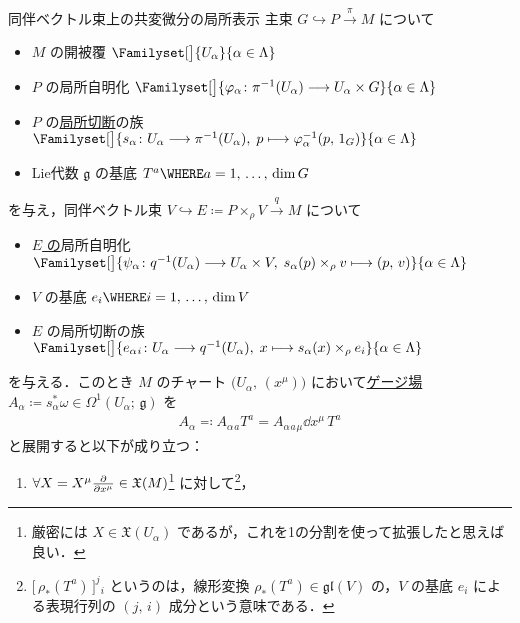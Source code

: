 \documentclass[TQFT_main]{subfiles}
\begin{document}
\begin{mytheo}[label=thm:codv-assoc-local,breakable]{同伴ベクトル束上の共変微分の局所表示}
    主束 $G \hookrightarrow P \xrightarrow{\pi} M$ について
    \begin{itemize}
        \item $M$ の開被覆 $\Familyset[\big]{U_\alpha}{\alpha \in \Lambda}$
        \item $P$ の局所自明化 $\Familyset[\big]{\varphi_\alpha \colon \pi^{-1}(U_\alpha) \lto U_\alpha \times G}{\alpha \in \Lambda}$
        \item $P$ の\hyperref[def.section]{局所切断}の族 $\Familyset[\big]{s_\alpha \colon U_\alpha \lto \pi^{-1}(U_\alpha),\; p \lmto \varphi_\alpha^{-1}(p,\, 1_G)}{\alpha \in \Lambda}$
        \item Lie代数 $\mathfrak{g}$ の基底 $T^a \WHERE a = 1,\, \dots,\, \dim G$
    \end{itemize}
    を与え，同伴ベクトル束 $V \hookrightarrow E \coloneqq P \times_\rho V \xrightarrow{q} M$ について
    \begin{itemize}
        \item \underline{$E$ の}局所自明化 $\Familyset[\big]{\psi_\alpha \colon q^{-1}(U_\alpha) \lto U_\alpha \times V,\; s_\alpha(p) \times_\rho v \lmto (p,\, v)}{\alpha \in \Lambda}$
        \item $V$ の基底 $e_i \WHERE i = 1,\, \dots,\, \dim V$
        \item $E$ の局所切断の族 $\Familyset[\big]{e_\alpha{}_i \colon U_\alpha \lto q^{-1}(U_\alpha),\; x \lmto s_\alpha (x) \times_\rho e_i}{\alpha \in \Lambda}$
    \end{itemize}
    を与える．このとき $M$ のチャート $\bigl(U_\alpha,\, (x^\mu)\bigr)$ において\hyperref[thm:local-connection]{ゲージ場} $A_\alpha \coloneqq s_\alpha^* \omega \in \Omega^{1}(U_\alpha;\, \mathfrak{g})$ を
    \begin{align}
        A_\alpha \eqqcolon A_{\alpha}{}_a T^a = A_{\alpha}{}_a{}_\mu \dd{x^\mu}\, T^a
    \end{align}
    と展開すると以下が成り立つ：
    \begin{enumerate}
        \item $\forall X = X^\mu \pdv{}{x^\mu} \in \mathfrak{X}(M)$\footnote{厳密には $X \in \mathfrak{X}(U_\alpha)$ であるが，これを1の分割を使って拡張したと思えば良い．} に対して\footnote{$ \bigl[\, \rho_*(T^a) \,\bigr]^j{}_i$ というのは，線形変換 $\rho_*(T^a) \in \mathfrak{gl}(V)$ の，$V$ の基底 $e_i$ による表現行列の $(j,\, i)$ 成分という意味である．}，

\end{enumerate}
\end{mytheo}
\end{document}
